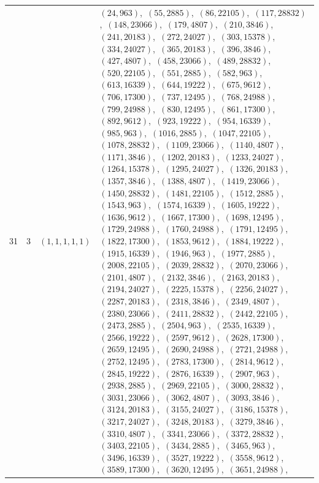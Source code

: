 \documentclass[11pt]{article}
\begin{document}
\begin{longtable}{@{}rrl>{\raggedright\arraybackslash}p{}@{}}
31 & 3 & $(1,1,1,1,1)$ & $(24,963)$,\allowbreak\ $(55,2885)$,\allowbreak\ $(86,22105)$,\allowbreak\ $(117,28832)$,\allowbreak\ $(148,23066)$,\allowbreak\ $(179,4807)$,\allowbreak\ $(210,3846)$,\allowbreak\ $(241,20183)$,\allowbreak\ $(272,24027)$,\allowbreak\ $(303,15378)$,\allowbreak\ $(334,24027)$,\allowbreak\ $(365,20183)$,\allowbreak\ $(396,3846)$,\allowbreak\ $(427,4807)$,\allowbreak\ $(458,23066)$,\allowbreak\ $(489,28832)$,\allowbreak\ $(520,22105)$,\allowbreak\ $(551,2885)$,\allowbreak\ $(582,963)$,\allowbreak\ $(613,16339)$,\allowbreak\ $(644,19222)$,\allowbreak\ $(675,9612)$,\allowbreak\ $(706,17300)$,\allowbreak\ $(737,12495)$,\allowbreak\ $(768,24988)$,\allowbreak\ $(799,24988)$,\allowbreak\ $(830,12495)$,\allowbreak\ $(861,17300)$,\allowbreak\ $(892,9612)$,\allowbreak\ $(923,19222)$,\allowbreak\ $(954,16339)$,\allowbreak\ $(985,963)$,\allowbreak\ $(1016,2885)$,\allowbreak\ $(1047,22105)$,\allowbreak\ $(1078,28832)$,\allowbreak\ $(1109,23066)$,\allowbreak\ $(1140,4807)$,\allowbreak\ $(1171,3846)$,\allowbreak\ $(1202,20183)$,\allowbreak\ $(1233,24027)$,\allowbreak\ $(1264,15378)$,\allowbreak\ $(1295,24027)$,\allowbreak\ $(1326,20183)$,\allowbreak\ $(1357,3846)$,\allowbreak\ $(1388,4807)$,\allowbreak\ $(1419,23066)$,\allowbreak\ $(1450,28832)$,\allowbreak\ $(1481,22105)$,\allowbreak\ $(1512,2885)$,\allowbreak\ $(1543,963)$,\allowbreak\ $(1574,16339)$,\allowbreak\ $(1605,19222)$,\allowbreak\ $(1636,9612)$,\allowbreak\ $(1667,17300)$,\allowbreak\ $(1698,12495)$,\allowbreak\ $(1729,24988)$,\allowbreak\ $(1760,24988)$,\allowbreak\ $(1791,12495)$,\allowbreak\ $(1822,17300)$,\allowbreak\ $(1853,9612)$,\allowbreak\ $(1884,19222)$,\allowbreak\ $(1915,16339)$,\allowbreak\ $(1946,963)$,\allowbreak\ $(1977,2885)$,\allowbreak\ $(2008,22105)$,\allowbreak\ $(2039,28832)$,\allowbreak\ $(2070,23066)$,\allowbreak\ $(2101,4807)$,\allowbreak\ $(2132,3846)$,\allowbreak\ $(2163,20183)$,\allowbreak\ $(2194,24027)$,\allowbreak\ $(2225,15378)$,\allowbreak\ $(2256,24027)$,\allowbreak\ $(2287,20183)$,\allowbreak\ $(2318,3846)$,\allowbreak\ $(2349,4807)$,\allowbreak\ $(2380,23066)$,\allowbreak\ $(2411,28832)$,\allowbreak\ $(2442,22105)$,\allowbreak\ $(2473,2885)$,\allowbreak\ $(2504,963)$,\allowbreak\ $(2535,16339)$,\allowbreak\ $(2566,19222)$,\allowbreak\ $(2597,9612)$,\allowbreak\ $(2628,17300)$,\allowbreak\ $(2659,12495)$,\allowbreak\ $(2690,24988)$,\allowbreak\ $(2721,24988)$,\allowbreak\ $(2752,12495)$,\allowbreak\ $(2783,17300)$,\allowbreak\ $(2814,9612)$,\allowbreak\ $(2845,19222)$,\allowbreak\ $(2876,16339)$,\allowbreak\ $(2907,963)$,\allowbreak\ $(2938,2885)$,\allowbreak\ $(2969,22105)$,\allowbreak\ $(3000,28832)$,\allowbreak\ $(3031,23066)$,\allowbreak\ $(3062,4807)$,\allowbreak\ $(3093,3846)$,\allowbreak\ $(3124,20183)$,\allowbreak\ $(3155,24027)$,\allowbreak\ $(3186,15378)$,\allowbreak\ $(3217,24027)$,\allowbreak\ $(3248,20183)$,\allowbreak\ $(3279,3846)$,\allowbreak\ $(3310,4807)$,\allowbreak\ $(3341,23066)$,\allowbreak\ $(3372,28832)$,\allowbreak\ $(3403,22105)$,\allowbreak\ $(3434,2885)$,\allowbreak\ $(3465,963)$,\allowbreak\ $(3496,16339)$,\allowbreak\ $(3527,19222)$,\allowbreak\ $(3558,9612)$,\allowbreak\ $(3589,17300)$,\allowbreak\ $(3620,12495)$,\allowbreak\ $(3651,24988)$,\allowbreak\ 
\end{longtable}
\end{document}
